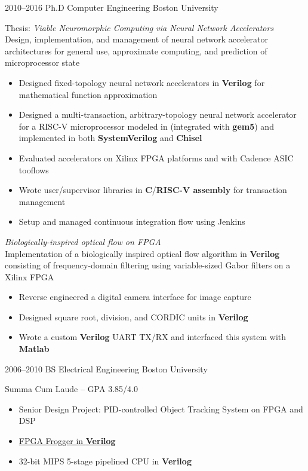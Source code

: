 \documentclass[]{friggeri-cv} %
\begin{document}
\begin{entrylist}


\entry
{2010--2016}
{Ph.D {\normalfont Computer Engineering}}
{Boston University}
{Thesis: \emph{Viable Neuromorphic Computing via Neural Network Accelerators} \\
  Design, implementation, and management of neural network accelerator architectures for general use, approximate computing, and prediction of microprocessor state
  \begin{itemize}
  \item Designed fixed-topology neural network accelerators in \textbf{Verilog} for mathematical function approximation
  \item Designed a multi-transaction, arbitrary-topology neural network accelerator for a RISC-V microprocessor modeled in \textbf{\CPP} (integrated with \textbf{gem5}) and implemented in both \textbf{SystemVerilog} and \textbf{Chisel}
  \item Evaluated accelerators on Xilinx FPGA platforms and with Cadence ASIC tooflows
  \item Wrote user/supervisor libraries in \textbf{C}/\textbf{RISC-V assembly} for transaction management
  \item Setup and managed continuous integration flow using Jenkins
  \end{itemize}
  \emph{Biologically-inspired optical flow on FPGA} \\
  Implementation of a biologically inspired optical flow algorithm in \textbf{Verilog} consisting of frequency-domain filtering using variable-sized Gabor filters on a Xilinx FPGA
  \begin{itemize}
  \item Reverse engineered a digital camera interface for image capture
  \item Designed square root, division, and CORDIC units in \textbf{Verilog}
  \item Wrote a custom \textbf{Verilog} UART TX/RX and interfaced this system with \textbf{Matlab}
  \end{itemize}
}


\entry
{2006--2010}
{BS {\normalfont Electrical Engineering}}
{Boston University}
{Summa Cum Laude -- GPA 3.85/4.0
  \begin{itemize}
  \item Senior Design Project: PID-controlled Object Tracking System on FPGA and DSP
  \item \href{https://www.youtube.com/watch?v=S2LgUL5JLqQ}{FPGA Frogger in \textbf{Verilog}}
  \item 32-bit MIPS 5-stage pipelined CPU in \textbf{Verilog}
  \end{itemize}
}


\end{entrylist}
\end{document}
